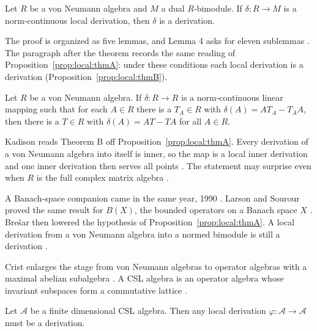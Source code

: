 \begin{proposition}\label{prop:local:thmA}
Let $R$ be a von Neumann algebra and $M$ a dual $R$-bimodule. If
$\delta\colon R\to M$ is a norm-continuous local derivation, then $\delta$
is a derivation.
\end{proposition}

The proof is organized as five lemmas, and Lemma 4 asks for eleven
sublemmas \cite[p.~496]{Kadison1990Local}. The paragraph after the theorem
records the same reading of Proposition~\ref{prop:local:thmA}: under these
conditions each local derivation is a derivation \cite[p.~496]{Kadison1990Local} (Proposition~\ref{prop:local:thmB}).

\begin{proposition}\label{prop:local:thmB}
Let $R$ be a von Neumann algebra. If $\delta\colon R\to R$ is a
norm-continuous linear mapping such that for each $A\in R$ there is a
$T_{A}\in R$ with $\delta(A)=AT_{A}-T_{A}A$, then there is a $T\in R$
with $\delta(A)=AT-TA$ for all $A\in R$.
\end{proposition}

Kadison reads Theorem B off Proposition~\ref{prop:local:thmA}. Every
derivation of a von Neumann algebra into itself is inner, so the map is a
local inner derivation and one inner derivation then serves all points
\cite[p.~507]{Kadison1990Local}. The statement may surprise even when $R$
is the full complex matrix algebra \cite[p.~494]{Kadison1990Local}.

A Banach-space companion came in the same year, 1990
\cite[p.~78]{Crist1996Local}. Larson and Sourour proved the same result for
$B(X)$, the bounded operators on a Banach space $X$
\cite[p.~78]{Crist1996Local}.
Bre\v{s}ar then lowered the hypothesis of Proposition~\ref{prop:local:thmA}.
A local derivation from a von Neumann algebra into a normed bimodule is
still a derivation \cite[p.~78]{Crist1996Local}.

Crist enlarges the stage from von Neumann algebras to operator algebras
with a maximal abelian subalgebra \cite[p.~76]{Crist1996Local}. A CSL
algebra is an operator algebra whose invariant subspaces form a commutative
lattice \cite[p.~76]{Crist1996Local}.

\begin{theorem}\label{thm:local:csl}
Let $\mathcal{A}$ be a finite dimensional CSL algebra. Then any local
derivation $\varphi\colon\mathcal{A}\to\mathcal{A}$ must be a derivation.
\end{theorem}

